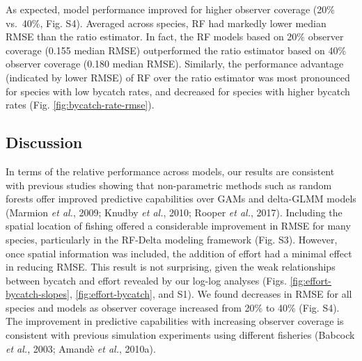 \documentclass[]{article}
\begin{document}
As expected, model performance improved for higher observer coverage
(20\% vs.~40\%, Fig. S4). Averaged across species, RF had markedly lower
median RMSE than the ratio estimator. In fact, the RF models based on
20\% observer coverage (0.155 median RMSE) outperformed the ratio
estimator based on 40\% observer coverage (0.180 median RMSE).
Similarly, the performance advantage (indicated by lower RMSE) of RF
over the ratio estimator was most pronounced for species with low
bycatch rates, and decreased for species with higher bycatch rates (Fig.
\ref{fig:bycatch-rate-rmse}).

\hypertarget{discussion}{%
\subsection{Discussion}\label{discussion}}

In terms of the relative performance across models, our results are
consistent with previous studies showing that non-parametric methods
such as random forests offer improved predictive capabilities over GAMs
and delta-GLMM models (Marmion \emph{et al.}, 2009; Knudby \emph{et
al.}, 2010; Rooper \emph{et al.}, 2017). Including the spatial location
of fishing offered a considerable improvement in RMSE for many species,
particularly in the RF-Delta modeling framework (Fig. S3). However, once
spatial information was included, the addition of effort had a minimal
effect in reducing RMSE. This result is not surprising, given the weak
relationships between bycatch and effort revealed by our log-log
analyses (Figs. \ref{fig:effort-bycatch-slopes},
\ref{fig:effort-bycatch}, and S1). We found decreases in RMSE for all
species and models as observer coverage increased from 20\% to 40\%
(Fig. S4). The improvement in predictive capabilities with increasing
observer coverage is consistent with previous simulation experiments
using different fisheries (Babcock \emph{et al.}, 2003; Amandè \emph{et
al.}, 2010a).
\end{document}
